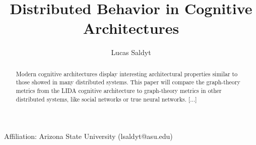 \documentclass{nature}
\title{Distributed Behavior in Cognitive Architectures}
\author{Lucas Saldyt}
\begin{document}
\maketitle

\begin{affiliations}
    \item Affiliation: Arizona State University (lsaldyt@asu.edu)
\end{affiliations}

\begin{abstract}
    Modern cognitive architectures display interesting architectural properties similar to those showed in many distributed systems.
    This paper will compare the graph-theory metrics from the LIDA cognitive architecture to graph-theory metrics in other distributed systems, like social networks or true neural networks.
    [...]
\end{abstract}

\end{document}
